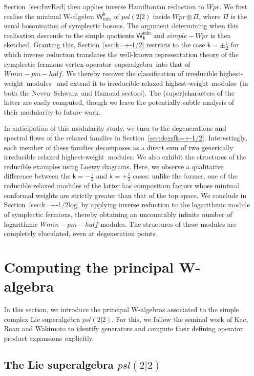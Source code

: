 \documentclass[10pt,a4paper]{amsart}
\numberwithin{equation}{section}
\newcommand{\kk}{\mathsf{k}} %
\newcommand{\alg}[1]{\mathfrak{#1}} %
\newcommand{\VOA}[1]{\mathsf{#1}} %
\newcommand{\SLSA}[3]{\alg{#1}_{#2 \vert #3}} %
\newcommand{\psl}{\SLSA{psl}{2}{2}}
\newcommand{\lsymb}{\Pi}
\newcommand{\lvoa}{\lsymb} %
\newcommand{\uwalg}[2]{\VOA{W}^{#1}_{\mathrm{#2}}} %
\newcommand{\swalg}[2]{\VOA{W}_{#1}^{\mathrm{#2}}} %
\newcommand{\upr}[1][\kk]{\uwalg{#1}{pr}} %
\newcommand{\umin}[1][\kk]{\uwalg{#1}{min}} %
\newcommand{\spr}[1][\kk]{\swalg{#1}{pr}} %
\newcommand{\smin}[1][\kk]{\swalg{#1}{min}} %
\newcommand{\sminpmhalf}{\smin[\pm 1/2]}
\newcommand{\ns}{Neveu--Schwarz}
\newcommand{\hw}{highest-weight}
\newcommand{\hwm}{\hw\ module}
\newcommand{\hwms}{\hwm s}
\newcommand{\rhw}{relaxed highest-weight}
\newcommand{\rhwm}{\rhw\ module}
\newcommand{\rhwms}{\rhwm s}
\newcommand{\vo}{vertex-operator}
\newcommand{\svoa}{\vo\ superalgebra}
\newcommand{\ope}{operator product expansion}
\newcommand{\opes}{\ope s}
\def\boldsymbol#1{#1}
\def\smash#1{#1}
\def\psl{psl(2|2)}
\def\upr{Wpr}
\def\spr{simple-Wpr}
\def\sminpmhalf{Wmin-pm-half}
\begin{document}
Section~\ref{sec:InvRed} then applies inverse Hamiltonian reduction to \smash{$\upr$}.
We first realise the minimal W-algebra \smash{$\umin$} of \smash{$\psl$} inside \smash{$\upr \otimes \lvoa$}, where \smash{$\lvoa$} is the usual bosonisation of symplectic bosons.
The argument determining when this realisation descends to the simple quotients $\smin$ and $\spr$ is then sketched.
Granting this, Section~\ref{sec:k=+-1/2} restricts to the case $\kk=\pm\frac{1}{2}$ for which inverse reduction translates the well-known representation theory of the symplectic fermions \svoa\ into that of \smash{$\sminpmhalf$}.
We thereby recover the classification of irreducible \hwms\ \cite{AdaRea14} and extend it to irreducible \rhwms\ (in both the \ns\ and Ramond sectors).
The (super)characters of the latter are easily computed, though we leave the potentially subtle analysis of their modularity to future work.

In anticipation of this modularity study, we turn to the degenerations and spectral flows of the relaxed families in Section~\ref{sec:degsfk=+-1/2}.
Interestingly, each member of these families decomposes as a direct sum of two generically irreducible \rhwms.
We also exhibit the structures of the reducible examples using Loewy diagrams.
Here, we observe a qualitative difference between the $\kk=-\frac{1}{2}$ and $\kk=+\frac{1}{2}$ cases: unlike the former, one of the reducible relaxed modules of the latter has composition factors whose minimal conformal weights are strictly greater than that of the top space.
We conclude in Section~\ref{sec:k=+-1/2log} by applying inverse reduction to the logarithmic module of symplectic fermions, thereby obtaining an uncountably infinite number of logarithmic \smash{$\sminpmhalf$}-modules.
The structures of these modules are completely elucidated, even at degeneration points.

\section{Computing the principal W-algebra} \label{sec:principal}

In this section, we introduce the principal W-algebras associated to the simple complex Lie superalgebra \smash{$\psl$}.
For this, we follow the seminal work of Kac, Roan and Wakimoto \cite{KacQua03} to identify generators and compute their defining \opes\ explicitly.

\subsection[The Lie superalgebra psl]{The Lie superalgebra $\boldsymbol{\psl}$} \label{sec:psl}
\end{document}

